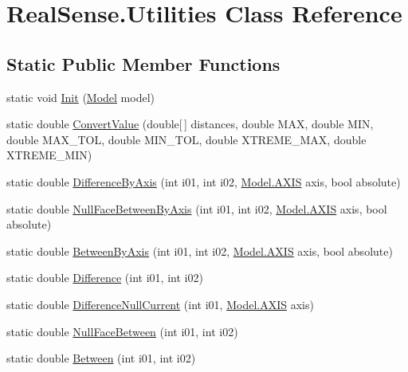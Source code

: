 \hypertarget{class_real_sense_1_1_utilities}{}\section{Real\+Sense.\+Utilities Class Reference}
\label{class_real_sense_1_1_utilities}
\subsection*{Static Public Member Functions}
\begin{DoxyCompactItemize}
\item 
static void \hyperlink{class_real_sense_1_1_utilities_a9c938b11059e630719239cac212fae36}{Init} (\hyperlink{class_real_sense_1_1_model}{Model} model)
\item 
static double \hyperlink{class_real_sense_1_1_utilities_a1988c5d325a1d252d42ce6cb0638404e}{Convert\+Value} (double\mbox{[}$\,$\mbox{]} distances, double M\+AX, double M\+IN, double M\+A\+X\+\_\+\+T\+OL, double M\+I\+N\+\_\+\+T\+OL, double X\+T\+R\+E\+M\+E\+\_\+\+M\+AX, double X\+T\+R\+E\+M\+E\+\_\+\+M\+IN)
\item 
static double \hyperlink{class_real_sense_1_1_utilities_a46ab13ced92a5c23b776d553eecb6a8a}{Difference\+By\+Axis} (int i01, int i02, \hyperlink{class_real_sense_1_1_model_ab1d8b9992dae2162c48b52f6694f946b}{Model.\+A\+X\+IS} axis, bool absolute)
\item 
static double \hyperlink{class_real_sense_1_1_utilities_a4b9b7b1afb00bad3ced945c757aaf711}{Null\+Face\+Between\+By\+Axis} (int i01, int i02, \hyperlink{class_real_sense_1_1_model_ab1d8b9992dae2162c48b52f6694f946b}{Model.\+A\+X\+IS} axis, bool absolute)
\item 
static double \hyperlink{class_real_sense_1_1_utilities_a4185e676947ed9d5da9a5ce28e922ff6}{Between\+By\+Axis} (int i01, int i02, \hyperlink{class_real_sense_1_1_model_ab1d8b9992dae2162c48b52f6694f946b}{Model.\+A\+X\+IS} axis, bool absolute)
\item 
static double \hyperlink{class_real_sense_1_1_utilities_afb6700357b260189d5309e5c15463ad8}{Difference} (int i01, int i02)
\item 
static double \hyperlink{class_real_sense_1_1_utilities_a23b4df029d2788415f1983b90cde0c67}{Difference\+Null\+Current} (int i01, \hyperlink{class_real_sense_1_1_model_ab1d8b9992dae2162c48b52f6694f946b}{Model.\+A\+X\+IS} axis)
\item 
static double \hyperlink{class_real_sense_1_1_utilities_a7a94b87d3f23a88d4bddeb6307073b0e}{Null\+Face\+Between} (int i01, int i02)
\item 
static double \hyperlink{class_real_sense_1_1_utilities_ac8eceed552d66f2f614160cf84e605e2}{Between} (int i01, int i02)
\end{DoxyCompactItemize}


